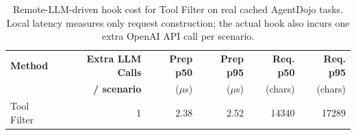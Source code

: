 \begin{table}[t]
\centering
\caption{Remote-LLM-driven hook cost for Tool Filter on real cached AgentDojo tasks. Local latency measures only request construction; the actual hook also incurs one extra OpenAI API call per scenario.}
\label{tab:system-hook-remote-llm}
\small
\begin{tabular}{lrrrrr}
\toprule
\textbf{Method} & \textbf{Extra LLM Calls} & \textbf{Prep p50} & \textbf{Prep p95} & \textbf{Req. p50} & \textbf{Req. p95} \\
 & \textbf{/ scenario} & ($\mu$s) & ($\mu$s) & (chars) & (chars) \\
\midrule
Tool Filter & 1 & 2.38 & 2.52 & 14340 & 17289 \\
\bottomrule
\end{tabular}
\end{table}